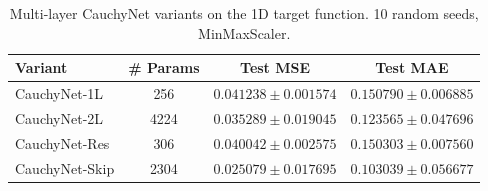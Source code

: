 \begin{table}[ht]\centering
\caption{Multi-layer CauchyNet variants on the 1D target function. 10 random seeds, MinMaxScaler.}
\label{tab:multilayer}
\begin{tabular}{lccc}
\toprule
Variant & \# Params & Test MSE & Test MAE \\
\midrule
CauchyNet-1L & 256 & $0.041238 \pm 0.001574$ & $0.150790 \pm 0.006885$ \\
CauchyNet-2L & 4224 & $0.035289 \pm 0.019045$ & $0.123565 \pm 0.047696$ \\
CauchyNet-Res & 306 & $0.040042 \pm 0.002575$ & $0.150303 \pm 0.007560$ \\
CauchyNet-Skip & 2304 & $0.025079 \pm 0.017695$ & $0.103039 \pm 0.056677$ \\
\bottomrule
\end{tabular}
\end{table}